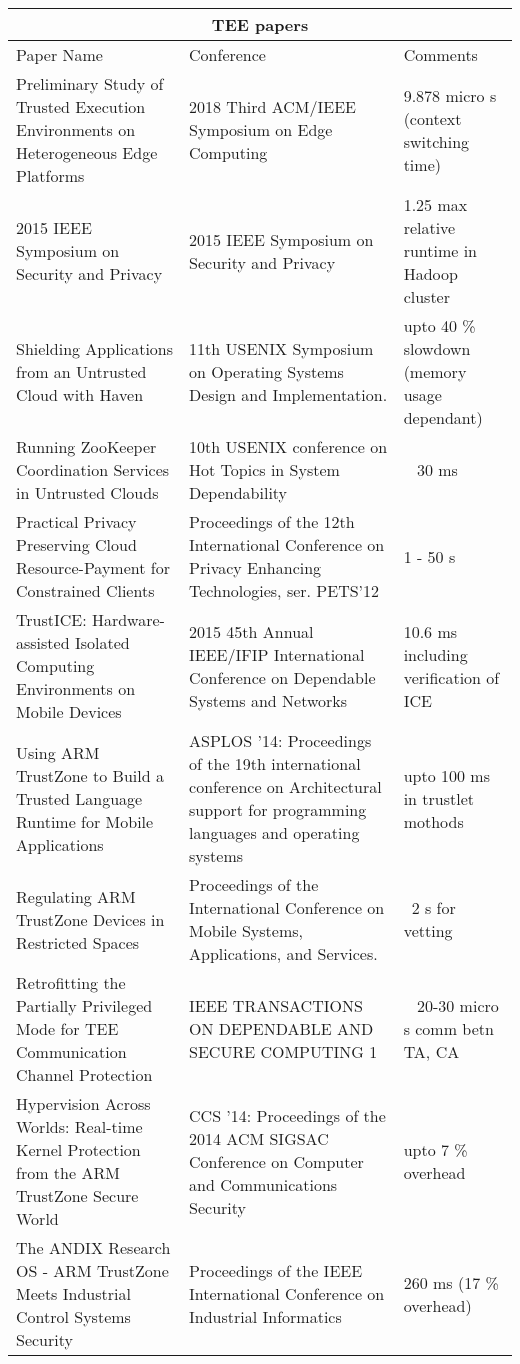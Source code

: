 \documentclass[conference]{IEEEtran}
\begin{document}
\begin{tabular}{ |p{2cm}||p{2cm}|p{2cm}|  }
    \hline
    \multicolumn{3}{|c|}{TEE papers} \\
    \hline
    Paper Name& Conference &Comments\\
    \hline
    Preliminary Study of Trusted Execution Environments on Heterogeneous Edge Platforms   & 2018 Third ACM/IEEE Symposium on Edge Computing   & 9.878 micro s (context switching time)  \\
    2015 IEEE Symposium on Security and Privacy &   2015 IEEE Symposium on Security and Privacy  & 1.25 max relative runtime in Hadoop cluster  \\
    Shielding Applications from an Untrusted Cloud with Haven &11th USENIX Symposium on Operating Systems Design and Implementation. & upto 40 \% slowdown (memory usage dependant) \\
    Running ZooKeeper Coordination Services in Untrusted Clouds  &10th USENIX conference on Hot Topics in System Dependability & ~ 30 ms \\
    Practical Privacy Preserving Cloud Resource-Payment for Constrained Clients&   Proceedings of the 12th International Conference on Privacy Enhancing Technologies, ser. PETS’12  & 1 - 50 s\\
    TrustICE: Hardware-assisted Isolated Computing Environments on Mobile Devices& 2015 45th Annual IEEE/IFIP International Conference on Dependable Systems and Networks  & 10.6 ms including verification of ICE   \\
    Using ARM TrustZone to Build a Trusted Language Runtime for Mobile Applications& ASPLOS '14: Proceedings of the 19th international conference on Architectural support for programming languages and operating systems  & upto 100 ms in trustlet mothods\\
    Regulating ARM TrustZone Devices in Restricted Spaces & Proceedings of the International Conference on Mobile Systems, Applications, and Services. & ~2 s for vetting\\
    Retrofitting the Partially Privileged Mode for TEE Communication Channel Protection & IEEE TRANSACTIONS ON DEPENDABLE AND SECURE COMPUTING 1 & ~ 20-30 micro s comm betn TA, CA\\
    Hypervision Across Worlds: Real-time Kernel Protection from the ARM TrustZone Secure World & CCS '14: Proceedings of the 2014 ACM SIGSAC Conference on Computer and Communications Security & upto 7 \% overhead \\
    The ANDIX Research OS - ARM TrustZone Meets Industrial Control Systems Security & Proceedings of the IEEE International Conference on Industrial Informatics & 260 ms (17 \% overhead) \\

\end{tabular}
\end{document}
